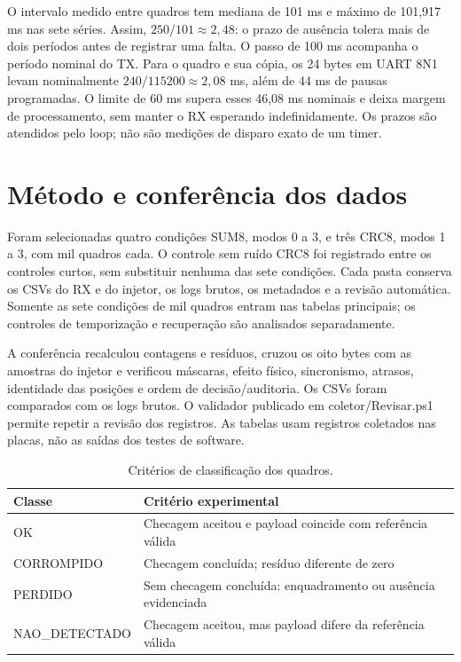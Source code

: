 \documentclass[12pt,a4paper]{article}
\begin{document}
O intervalo medido entre quadros tem mediana de 101 ms e máximo de 101,917 ms nas sete séries. Assim, $250/101\approx2{,}48$: o prazo de ausência tolera mais de dois períodos antes de registrar uma falta. O passo de 100 ms acompanha o período nominal do TX. Para o quadro e sua cópia, os 24 bytes em UART 8N1 levam nominalmente $240/115200\approx2{,}08$ ms, além de 44 ms de pausas programadas. O limite de 60 ms supera esses 46,08 ms nominais e deixa margem de processamento, sem manter o RX esperando indefinidamente. Os prazos são atendidos pelo loop; não são medições de disparo exato de um timer.\par

\section{Método e conferência dos dados}

Foram selecionadas quatro condições SUM8, modos 0 a 3, e três CRC8, modos 1 a 3, com mil quadros cada. O controle sem ruído CRC8 foi registrado entre os controles curtos, sem substituir nenhuma das sete condições. Cada pasta conserva os CSVs do RX e do injetor, os logs brutos, os metadados e a revisão automática. Somente as sete condições de mil quadros entram nas tabelas principais; os controles de temporização e recuperação são analisados separadamente.\par

A conferência recalculou contagens e resíduos, cruzou os oito bytes com as amostras do injetor e verificou máscaras, efeito físico, sincronismo, atrasos, identidade das posições e ordem de decisão/auditoria. Os CSVs foram comparados com os logs brutos. O validador publicado em coletor/Revisar.ps1 permite repetir a revisão dos registros. As tabelas usam registros coletados nas placas, não as saídas dos testes de software.\par

\begin{table}[htbp]\centering\small\caption{Critérios de classificação dos quadros.}\begin{tabular}{>{\raggedright\arraybackslash}p{}>{\raggedright\arraybackslash}p{}}\toprule

\textbf{Classe} & \textbf{Critério experimental} \\

\midrule

OK & Checagem aceitou e payload coincide com referência válida \\

CORROMPIDO & Checagem concluída; resíduo diferente de zero \\

PERDIDO & Sem checagem concluída: enquadramento ou ausência evidenciada \\

NAO\_DETECTADO & Checagem aceitou, mas payload difere da referência válida \\

\bottomrule\end{tabular}\end{table}
\end{document}
